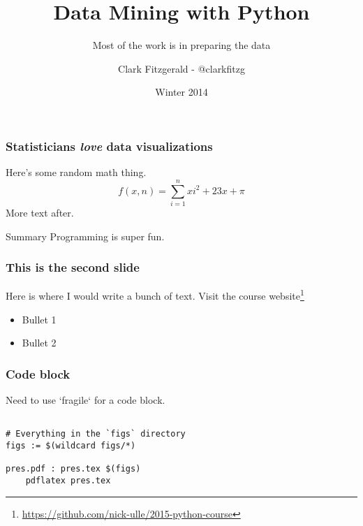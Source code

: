 \documentclass{beamer}
\begin{document}
\title[Python] %
{Data Mining with Python}
\subtitle{Most of the work is in preparing the data}
\author{Clark Fitzgerald - @clarkfitzg}
\date{Winter 2014} %
\subject{Statistics}

\frame{\titlepage}


\begin{frame}


\frametitle{Statisticians \emph{love} data visualizations}

Here's some random math thing.
\[
    f(x, n) = \sum_{i=1}^n x i^2 + 23x + \pi
\]
More text after.

    \begin{block}{Summary}
    Programming is super fun.
    \end{block}


\end{frame}
\begin{frame}


\frametitle{This is the second slide}
Here is where I would write a bunch of text. Visit the course website\footnote{\url{https://github.com/nick-ulle/2015-python-course}}

\begin{itemize}
\item Bullet 1
\item Bullet 2
\end{itemize}


\end{frame}
\begin{frame}[fragile]


\frametitle{Code block}

Need to use `fragile` for a code block.

\begin{verbatim}

# Everything in the `figs` directory
figs := $(wildcard figs/*)

pres.pdf : pres.tex $(figs)
    pdflatex pres.tex

\end{verbatim}


\end{frame}
\end{document}
